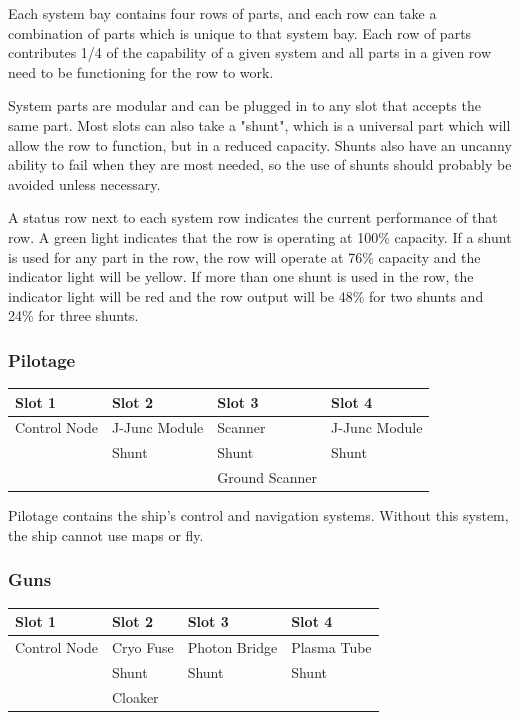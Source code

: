 \begin{itemize}
Each system bay contains four rows of parts, and each row can take a
combination of parts which is unique to that system bay.  Each row of
parts contributes 1/4 of the capability of a given system and all parts
in a given row need to be functioning for the row to work.

System parts are modular and can be plugged in to any slot that accepts the
same part.  Most slots can also take a "shunt", which is a universal part
which will allow the row to function, but in a reduced capacity.  Shunts
also have an uncanny ability to fail when they are most needed, so the use
of shunts should probably be avoided unless necessary.

A status row next to each system row indicates the current performance
of that row.  A green light indicates that the row is operating at
100\% capacity.  If a shunt is used for any part in the row, the row will
operate at 76\% capacity and the indicator light will be yellow.  If
more than one shunt is used in the row, the indicator light will be red
and the row output will be 48\% for two shunts and 24\% for three shunts.

\subsubsection{Pilotage}

\begin{tabular}{ | p{2.5cm} | p{2.5cm} | p{2.5cm} | p{2.5cm} | }
\hline
Slot 1 & Slot 2 & Slot 3 & Slot 4 \\ \hline
Control Node & J-Junc Module & Scanner & J-Junc Module \\
& Shunt & Shunt & Shunt \\
& & Ground Scanner & \\
\hline
\end{tabular}

Pilotage contains the ship's control and navigation systems. Without this system, the ship cannot use maps or fly.

\subsubsection{Guns}

\begin{tabular}{ | p{2.5cm} | p{2.5cm} | p{2.5cm} | p{2.5cm} | }
\hline
Slot 1 & Slot 2 & Slot 3 & Slot 4 \\ \hline
Control Node & Cryo Fuse & Photon Bridge & Plasma Tube \\
& Shunt & Shunt & Shunt \\
& Cloaker & & \\
\hline
\end{tabular}


\end{itemize}
